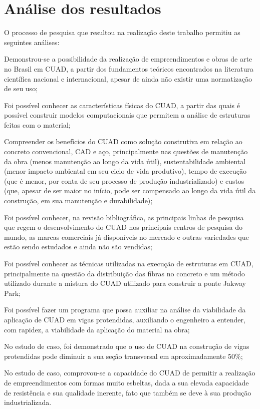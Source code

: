 \chapter{Análise dos resultados}

O processo de pesquisa que resultou na realização deste trabalho permitiu as seguintes análises:

\begin{alineas}[label=\textbullet]
	\item Demonstrou-se a possibilidade da realização de empreendimentos e obras de arte no Brasil em CUAD, a partir dos fundamentos teóricos encontrados na literatura científica nacional e internacional, apesar de ainda não existir uma normatização de seu uso;
	\item Foi possível conhecer as características físicas do CUAD, a partir das quais é possível construir modelos computacionais que permitem a análise de estruturas feitas com o material;
	\item Compreender os benefícios do CUAD como solução construtiva em relação ao concreto convencional, CAD e aço, principalmente nas questões de manutenção da obra (menos manutenção ao longo da vida útil), sustentabilidade ambiental (menor impacto ambiental em seu ciclo de vida produtivo), tempo de execução (que é menor, por conta de seu processo de produção industrializado) e custos (que, apesar de ser maior no início, pode ser compensado ao longo da vida útil da construção, em sua manutenção e durabilidade);
	\item Foi possível conhecer, na revisão bibliográfica, as principais linhas de pesquisa que regem o desenvolvimento do CUAD nos principais centros de pesquisa do mundo, as marcas comerciais já disponíveis no mercado e outras variedades que estão sendo estudados e ainda não são vendidas;
	\item Foi possível conhecer as técnicas utilizadas na execução de estruturas em CUAD, principalmente na questão da distribuição das fibras no concreto e um método utilizado durante a mistura do CUAD utilizado para construir a ponte Jakway Park;
	\item Foi possível fazer um programa que possa auxiliar na análise da viabilidade da aplicação de CUAD em vigas protendidas, auxiliando o engenheiro a entender, com rapidez, a viabilidade da aplicação do material na obra;
	\item No estudo de caso, foi demonstrado que o uso de CUAD na construção de vigas protendidas pode diminuir a sua seção transversal em aproximadamente 50\%;
	\item No estudo de caso, comprovou-se a capacidade do CUAD de permitir a realização de empreendimentos com formas muito esbeltas, dada a sua elevada capacidade de resistência e sua qualidade inerente, fato que também se deve à sua produção industrializada.
\end{alineas}